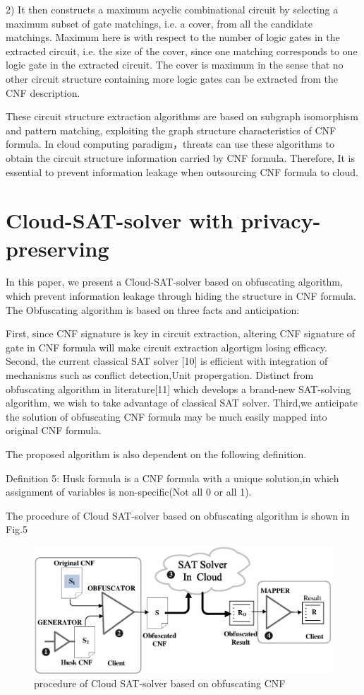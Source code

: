 \documentclass[runningheads,a4paper]{llncs}
\begin{document}
2) It then constructs a maximum acyclic combinational circuit by selecting a maximum subset of gate matchings, i.e. a cover, from all the candidate matchings. Maximum here is with respect to the number of logic gates in the extracted circuit, i.e. the size of the cover, since one matching corresponds to one logic gate in the extracted circuit. The cover is maximum in the sense that no other circuit structure containing more logic gates can be extracted from the CNF description.

These circuit structure extraction algorithms are based on subgraph isomorphism and pattern matching, exploiting the graph structure characteristics of CNF formula. In cloud computing paradigm，threats can use these algorithms to obtain the circuit structure information carried by CNF formula. Therefore, It is essential to prevent information leakage when outsourcing CNF formula to cloud.

\section{Cloud-SAT-solver with privacy-preserving}

In this paper, we present a Cloud-SAT-solver based on obfuscating algorithm, which prevent information leakage through hiding the structure in CNF formula.
The Obfuscating algorithm is based on three facts and anticipation:

First, since CNF signature is key in circuit extraction, altering CNF signature of gate in CNF formula will make circuit extraction algortigm losing efficacy.
Second, the current classical SAT solver [10] is efficient with integration of mechanisms such as conflict detection,Unit propergation.
Distinct from obfuscating algorithm in literature[11] which develops a brand-new SAT-solving algorithm, we wish to take advantage of classical SAT solver.
Third,we anticipate the solution of obfuscating CNF formula may be much easily mapped into original CNF formula.

The proposed algorithm is also dependent on the following definition.

\noindent Definition 5: Husk formula is a CNF formula with a unique solution,in which assignment of variables is non-specific(Not all 0 or all 1).

The procedure of Cloud SAT-solver based on obfuscating algorithm is shown in Fig.5
\begin{figure}
\centering
\includegraphics[width=11.2cm]{a5}
\caption{procedure of Cloud SAT-solver based on obfuscating CNF}
\end{figure}
\end{document}
